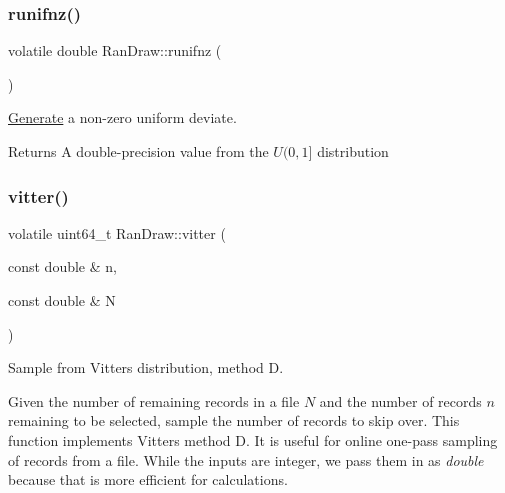 \subsubsection{\texorpdfstring{runifnz()}{runifnz()}}
{\footnotesize\ttfamily volatile double Ran\+Draw\+::runifnz (\begin{DoxyParamCaption}{ }\end{DoxyParamCaption})}



\hyperlink{classsamp_files_1_1_generate}{Generate} a non-\/zero uniform deviate. 

\begin{DoxyReturn}{Returns}
A double-\/precision value from the $ U(0,1]$ distribution 
\end{DoxyReturn}
\mbox{\label{classsamp_files_1_1_ran_draw_a2dcd2540f148c4fa271156a46640f701}} 
\subsubsection{\texorpdfstring{vitter()}{vitter()}}
{\footnotesize\ttfamily volatile uint64\+\_\+t Ran\+Draw\+::vitter (\begin{DoxyParamCaption}\item[{const double \&}]{n,  }\item[{const double \&}]{N }\end{DoxyParamCaption})}



Sample from Vitter\textquotesingle{}s distribution, method D. 

Given the number of remaining records in a file $N$ and the number of records $n$ remaining to be selected, sample the number of records to skip over. This function implements Vitter\textquotesingle{}s \cite{vitter84a} \cite{vitter87a} method D. It is useful for online one-\/pass sampling of records from a file. While the inputs are integer, we pass them in as {\itshape double} because that is more efficient for calculations.


